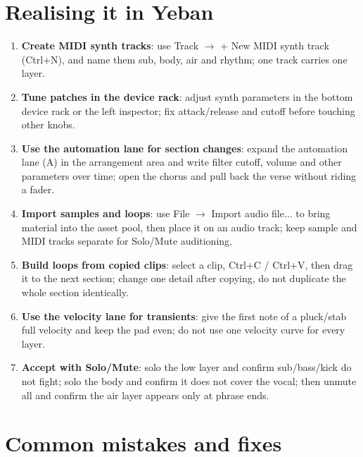 \section{Realising it in Yeban}
\label{sec:electronic-yeban}

\begin{enumerate}
\item \textbf{Create MIDI synth tracks}: use Track $\rightarrow$ + New MIDI synth track (Ctrl+N), and name them sub, body, air and rhythm; one track carries one layer.
\item \textbf{Tune patches in the device rack}: adjust synth parameters in the bottom device rack or the left inspector; fix attack/release and cutoff before touching other knobs.
\item \textbf{Use the automation lane for section changes}: expand the automation lane (A) in the arrangement area and write filter cutoff, volume and other parameters over time; open the chorus and pull back the verse without riding a fader.
\item \textbf{Import samples and loops}: use File $\rightarrow$ Import audio file... to bring material into the asset pool, then place it on an audio track; keep sample and MIDI tracks separate for Solo/Mute auditioning.
\item \textbf{Build loops from copied clips}: select a clip, Ctrl+C / Ctrl+V, then drag it to the next section; change one detail after copying, do not duplicate the whole section identically.
\item \textbf{Use the velocity lane for transients}: give the first note of a pluck/stab full velocity and keep the pad even; do not use one velocity curve for every layer.
\item \textbf{Accept with Solo/Mute}: solo the low layer and confirm sub/bass/kick do not fight; solo the body and confirm it does not cover the vocal; then unmute all and confirm the air layer appears only at phrase ends.
\end{enumerate}


\section{Common mistakes and fixes}
\label{sec:electronic-mistakes}

